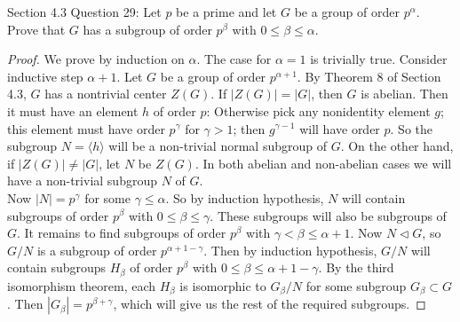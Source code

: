Section 4.3 Question 29:
Let $p$ be a prime and let $G$ be a group of order $p^\alpha$. Prove that
$G$ has a subgroup of order $p^\beta$ with $0\leq\beta\leq\alpha$.

\begin{proof}
  We prove by induction on $\alpha$. The case for $\alpha=1$ is trivially
  true. Consider inductive step $\alpha+1$. Let $G$ be a group of order
  $p^{\alpha+1}$. By Theorem 8 of Section 4.3, $G$ has a nontrivial center
  $Z(G)$. If $|Z(G)|=|G|$, then $G$ is abelian. Then it must have an
  element $h$ of order $p$: Otherwise pick any nonidentity element $g$; this
  element must have order $p^\gamma$ for $\gamma>1$; then $g^{\gamma-1}$
  will have order $p$. So the subgroup $N=\langle h\rangle$ will be a
  non-trivial normal subgroup of $G$. On the other hand, if
  $|Z(G)|\neq|G|$, let $N$ be $Z(G)$. In both abelian and non-abelian cases
  we will have a non-trivial subgroup $N$ of $G$. \\

  Now $|N|=p^\gamma$ for some $\gamma\leq\alpha$. So by induction
  hypothesis, $N$ will contain subgroups of order $p^\beta$ with
  $0\leq\beta\leq\gamma$. These subgroups will also be subgroups of $G$. It
  remains to find subgroups of order $p^\beta$ with
  $\gamma<\beta\leq\alpha+1$. Now $N\triangleleft G$, so $G/N$ is a
  subgroup of order $p^{\alpha+1-\gamma}$. Then by induction hypothesis,
  $G/N$ will contain subgroups $H_\beta$ of order $p^\beta$ with
  $0\leq\beta\leq\alpha+1-\gamma$. By the third isomorphism theorem, each
  $H_\beta$ is isomorphic to $G_\beta/N$ for some subgroup
  $G_\beta\subset G$. Then $|G_\beta|=p^{\beta+\gamma}$, which will give us
  the rest of the required subgroups.
\end{proof}
